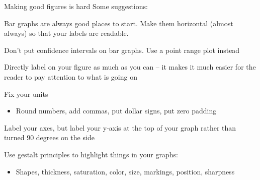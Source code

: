 \documentclass[notes,11pt, aspectratio=169]{beamer}
\newcommand\1{\operatorname{\mathbbm{1}}\indicatorfence}
\newenvironment{wideitemize}{\itemize\addtolength{\itemsep}{10pt}}{\enditemize}
\begin{document}
\begin{frame}{Making good figures is hard}
  Some suggestions:
  \begin{wideitemize}
  \item Bar graphs are always good places to start. Make them
    horizontal (almost always) so that your labels are readable.
  \item Don't put confidence intervals on bar graphs. Use a point
    range plot instead
  \item Directly label on your figure as much as you can -- it makes
    it much easier for the reader to pay attention to what is going on
  \item Fix your units
    \begin{itemize}
    \item Round numbers, add commas, put dollar signs, put zero
      padding
    \end{itemize}
  \item Label your axes, but label your y-axis at the top of your
    graph rather than turned 90 degrees on the side
  \item Use gestalt principles to highlight things in your graphs:
    \begin{itemize}
    \item Shapes, thickness, saturation, color, size, markings,
      position, sharpness
    \end{itemize}
  \end{wideitemize}
  
\end{frame}
\end{document}
